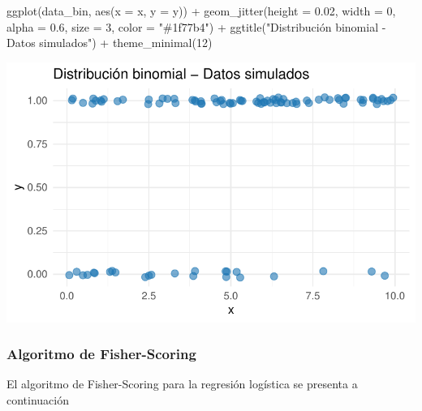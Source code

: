 \documentclass[
  letterpaper,
  DIV=11,
  numbers=noendperiod]{scrartcl}
\newenvironment{Shaded}{\begin{snugshade}}{\end{snugshade}}
\newcommand{\AttributeTok}[1]{\textcolor[rgb]{0.40,0.45,0.13}{#1}}
\newcommand{\DecValTok}[1]{\textcolor[rgb]{0.68,0.00,0.00}{#1}}
\newcommand{\FloatTok}[1]{\textcolor[rgb]{0.68,0.00,0.00}{#1}}
\newcommand{\FunctionTok}[1]{\textcolor[rgb]{0.28,0.35,0.67}{#1}}
\newcommand{\NormalTok}[1]{\textcolor[rgb]{0.00,0.23,0.31}{#1}}
\newcommand{\SpecialCharTok}[1]{\textcolor[rgb]{0.37,0.37,0.37}{#1}}
\newcommand{\StringTok}[1]{\textcolor[rgb]{0.13,0.47,0.30}{#1}}
\begin{document}
\begin{Shaded}
\begin{Highlighting}[]
\FunctionTok{ggplot}\NormalTok{(data\_bin, }\FunctionTok{aes}\NormalTok{(}\AttributeTok{x =}\NormalTok{ x, }\AttributeTok{y =}\NormalTok{ y)) }\SpecialCharTok{+}
    \FunctionTok{geom\_jitter}\NormalTok{(}\AttributeTok{height =} \FloatTok{0.02}\NormalTok{, }\AttributeTok{width =} \DecValTok{0}\NormalTok{, }
                \AttributeTok{alpha =} \FloatTok{0.6}\NormalTok{, }\AttributeTok{size =} \DecValTok{3}\NormalTok{, }\AttributeTok{color =} \StringTok{"\#1f77b4"}\NormalTok{) }\SpecialCharTok{+}
  \FunctionTok{ggtitle}\NormalTok{(}\StringTok{"Distribución binomial {-} Datos simulados"}\NormalTok{) }\SpecialCharTok{+}
  \FunctionTok{theme\_minimal}\NormalTok{(}\DecValTok{12}\NormalTok{)}
\end{Highlighting}
\end{Shaded}

\includegraphics[width=1\textwidth,height=\textheight]{Modelos_files/figure-pdf/unnamed-chunk-41-1.pdf}

\subsubsection{Algoritmo de
Fisher-Scoring}\label{algoritmo-de-fisher-scoring-1}

El algoritmo de Fisher-Scoring para la regresión logística se presenta a
continuación
\end{document}
